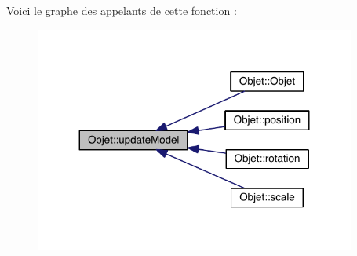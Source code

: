 Voici le graphe des appelants de cette fonction \+:
\nopagebreak
\begin{figure}[H]
\begin{center}
\leavevmode
\includegraphics[width=299pt]{class_objet_a0960722f5ddb16f2c245dca4e6584f25_icgraph}
\end{center}
\end{figure}




